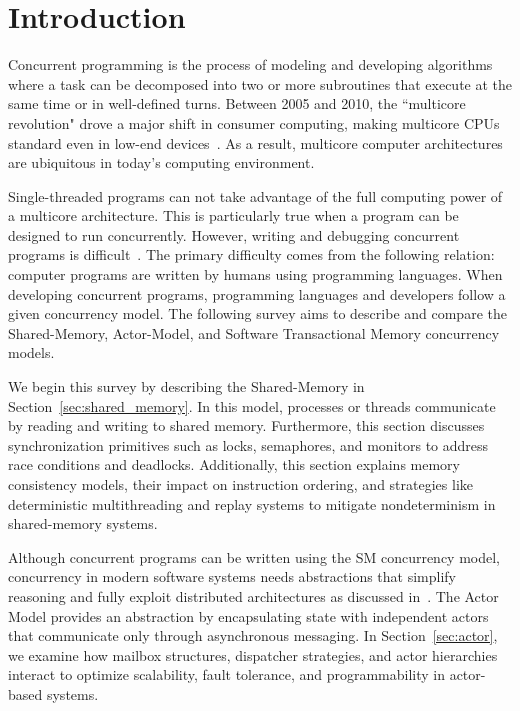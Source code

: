 \section{Introduction\label{sec:introduction}}
Concurrent programming is the process of modeling and
developing algorithms where a task can be decomposed into
two or more subroutines that execute at the same time or in well-defined turns.
Between 2005 and 2010, the ``multicore revolution" drove a major shift in consumer computing,
making multicore CPUs standard even in low-end devices~\cite{alseqyani2023history}.
As a result, multicore computer architectures are ubiquitous in today’s computing environment.

Single-threaded programs can not take advantage of the full computing power of a multicore architecture.
This is particularly true when a program can be designed to run concurrently.
However, writing and debugging concurrent programs is difficult~\cite{huang2016debuggingConcurrentPrograms}.
The primary difficulty comes from the following relation: computer programs
are written by humans using programming languages. 
When developing concurrent programs, programming languages and developers
follow a given concurrency model. The following survey aims to describe
and compare the Shared-Memory, Actor-Model, and Software Transactional Memory
concurrency models.

We begin this survey by describing the Shared-Memory
in Section~\ref{sec:shared_memory}.
In this model, processes or threads communicate by reading and writing
to shared memory.
Furthermore, this section discusses 
synchronization primitives such as locks, semaphores,
and monitors to address race conditions and deadlocks.
Additionally, this section explains memory consistency models,
their impact on instruction ordering,
and strategies like deterministic multithreading
and replay systems to mitigate
nondeterminism in shared-memory systems.

Although concurrent programs can be written using the SM concurrency
model, concurrency in modern software systems needs abstractions
that simplify reasoning and fully exploit distributed
architectures as discussed in~\cite{10.1145/357980.358021}.
The Actor Model provides an abstraction by encapsulating state
with independent actors that communicate only through
asynchronous messaging. In Section~\ref{sec:actor},
we examine how mailbox structures, dispatcher strategies,
and actor hierarchies interact to optimize scalability, fault tolerance,
and programmability in actor-based systems.

